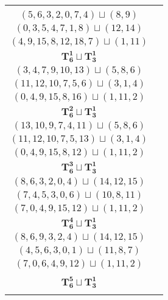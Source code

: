 \documentclass{article}
\begin{document}
\begin{longtable}{|c|c|}
\begin{tabular}{c}
        $(2,4,6,9,12,1,8)\sqcup(14,15)$ \\ 
        $(5,6,3,2,0,7,4)\sqcup(8,9)$ \\ 
        $(0,3,5,4,7,1,8)\sqcup(12,14)$ \\ 
        $(4,9,15,8,12,18,7)\sqcup(1,11)$
        \end{tabular} \\ 
        \hline
        $\mathbf{T_{6}^{1}} \sqcup \mathbf{T_{3}^{1}}$ & \begin{tabular}{c}
        $(1,2,4,6,9,12)\sqcup(13,14,15)$ \\ 
        $(3,4,7,9,10,13)\sqcup(5,8,6)$ \\ 
        $(11,12,10,7,5,6)\sqcup(3,1,4)$ \\ 
        $(0,4,9,15,8,16)\sqcup(1,11,2)$
        \end{tabular} \\ 
        \hline
        $\mathbf{T_{6}^{2}} \sqcup \mathbf{T_{3}^{1}}$ & \begin{tabular}{c}
        $(1,2,4,6,9,5)\sqcup(13,14,15)$ \\ 
        $(13,10,9,7,4,11)\sqcup(5,8,6)$ \\ 
        $(11,12,10,7,5,13)\sqcup(3,1,4)$ \\ 
        $(0,4,9,15,8,12)\sqcup(1,11,2)$
        \end{tabular} \\ 
        \hline
        $\mathbf{T_{6}^{3}} \sqcup \mathbf{T_{3}^{1}}$ & \begin{tabular}{c}
        $(0,1,2,4,6,5)\sqcup(16,13,14)$ \\ 
        $(8,6,3,2,0,4)\sqcup(14,12,15)$ \\ 
        $(7,4,5,3,0,6)\sqcup(10,8,11)$ \\ 
        $(7,0,4,9,15,12)\sqcup(1,11,2)$
        \end{tabular} \\ 
        \hline
        $\mathbf{T_{6}^{4}} \sqcup \mathbf{T_{3}^{1}}$ & \begin{tabular}{c}
        $(1,2,5,4,6,7)\sqcup(16,14,13)$ \\ 
        $(8,6,9,3,2,4)\sqcup(14,12,15)$ \\ 
        $(4,5,6,3,0,1)\sqcup(11,8,7)$ \\ 
        $(7,0,6,4,9,12)\sqcup(1,11,2)$
        \end{tabular} \\ 
        \hline
        $\mathbf{T_{6}^{5}} \sqcup \mathbf{T_{3}^{1}}$ & \begin{tabular}{c}

\end{tabular}
\end{longtable}
\end{document}
